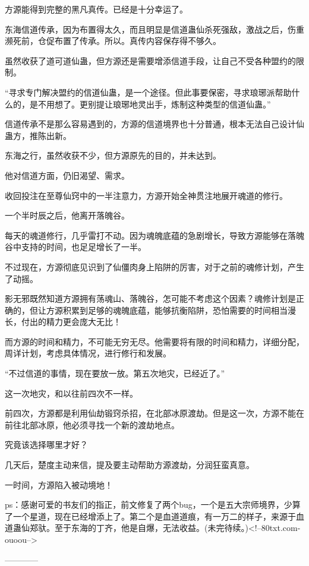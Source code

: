 \begin{this_body}
方源能得到完整的黑凡真传。已经是十分幸运了。

东海信道传承，因为布置得太久，而且明显是信道蛊仙杀死强敌，激战之后，伤重濒死前，仓促布置了传承。所以。真传内容保存得不够久。

虽然收获了道可道仙蛊，但方源还是需要增添信道手段，让自己不受各种盟约的限制。

“寻求专门解决盟约的信道仙蛊，是一个途径。但此事要保密，寻求琅琊派帮助什么的，是不用想了。更别提让琅琊地灵出手，炼制这种类型的信道仙蛊。”

信道传承不是那么容易遇到的，方源的信道境界也十分普通，根本无法自己设计仙蛊方，推陈出新。

东海之行，虽然收获不少，但方源原先的目的，并未达到。

他对信道方面，仍旧渴望、需求。

收回投注在至尊仙窍中的一半注意力，方源开始全神贯注地展开魂道的修行。

一个半时辰之后，他离开落魄谷。

每天的魂道修行，几乎雷打不动。因为魂魄底蕴的急剧增长，导致方源能够在落魄谷中支持的时间，也足足增长了一半。

不过现在，方源彻底见识到了仙僵肉身上陷阱的厉害，对于之前的魂修计划，产生了动摇。

影无邪既然知道方源拥有荡魂山、落魄谷，怎可能不考虑这个因素？魂修计划是正确的，但让方源积累到足够的魂魄底蕴，能够抗衡陷阱，恐怕需要的时间相当漫长，付出的精力更会庞大无比！

而方源的时间和精力，不可能无穷无尽。他需要将有限的时间和精力，详细分配，周详计划，考虑具体情况，进行修行和发展。

“不过信道的事情，现在要放一放。第五次地灾，已经近了。”

这一次地灾，和以往前四次不一样。

前四次，方源都是利用仙劫锻窍杀招，在北部冰原渡劫。但是这一次，方源不能在前往北部冰原，他必须寻找一个新的渡劫地点。

究竟该选择哪里才好？

几天后，楚度主动来信，提及要主动帮助方源渡劫，分润狂蛮真意。

一时间，方源陷入被动境地！

ps：感谢可爱的书友们的指正，前文修复了两个bug，一个是五大宗师境界，少算了一个星道，现在已经增添上了。第二个是血道道痕，有一万二的样子，来源于血道蛊仙郑驮。至于东海的丁齐，他是自爆，无法收益。(未完待续。)<!--80txt.com-ouoou-->

------------

\end{this_body}

